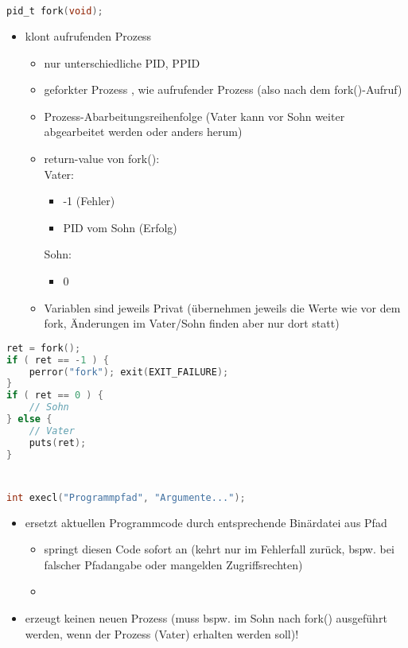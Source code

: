 \section[Fork]{}
\begin{lstlisting}[language=C]
pid_t fork(void);
\end{lstlisting}
\begin{itemize}
\item klont aufrufenden Prozess
\begin{itemize}[label=$\to$]
\item nur unterschiedliche PID, PPID
\item geforkter Prozess , wie aufrufender Prozess (also nach dem fork()-Aufruf)
\item Prozess-Abarbeitungsreihenfolge  (Vater kann vor Sohn weiter abgearbeitet werden oder anders herum)
\item return-value von fork():\\
Vater:
\begin{itemize}
\item -1 (Fehler)
\item PID vom Sohn (Erfolg)
\end{itemize}
Sohn:
\begin{itemize}
\item 0
\end{itemize}
\item Variablen sind jeweils Privat (übernehmen jeweils die Werte wie vor dem fork, Änderungen im Vater/Sohn finden aber nur dort statt)
\end{itemize}
\end{itemize}
\begin{lstlisting}[language=C]
ret = fork();
if ( ret == -1 ) {
	perror("fork"); exit(EXIT_FAILURE);
}
if ( ret == 0 ) {
	// Sohn
} else {
	// Vater
	puts(ret);
}
\end{lstlisting}
\section[Exec]{}
\begin{lstlisting}[language=C]
int execl("Programmpfad", "Argumente...");
\end{lstlisting}
\begin{itemize}
\item ersetzt aktuellen Programmcode durch entsprechende Binärdatei aus Pfad
\begin{itemize} [label=$\to$]
\item springt diesen Code sofort an (kehrt nur im Fehlerfall zurück, bspw. bei falscher Pfadangabe oder mangelden Zugriffsrechten)
\item {}
\end{itemize}
\item erzeugt keinen neuen Prozess (muss bspw. im Sohn nach fork() ausgeführt werden, wenn der Prozess (Vater) erhalten werden soll)!
\end{itemize}
